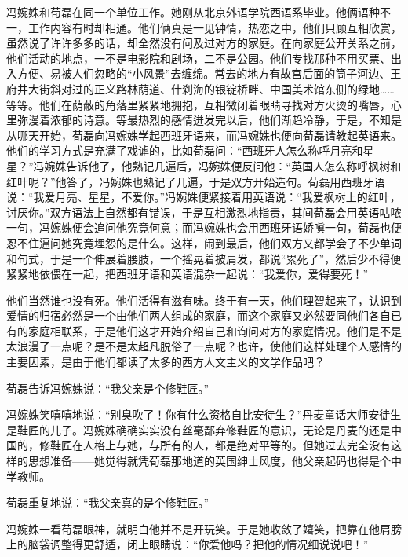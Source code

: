 \par 冯婉姝和荀磊在同一个单位工作。她刚从北京外语学院西语系毕业。他俩语种不一，工作内容有时却相通。他们俩真是一见钟情，热恋之中，他们只顾互相欣赏，虽然说了许许多多的话，却全然没有问及过对方的家庭。在向家庭公开关系之前，他们活动的地点，一不是电影院和剧场，二不是公园。他们专找那种不用买票、出入方便、易被人们忽略的“小风景”去缠绵。常去的地方有故宫后面的筒子河边、王府井大街斜对过的正义路林荫道、什刹海的银锭桥畔、中国美术馆东侧的绿地……等等。他们在荫蔽的角落里紧紧地拥抱，互相微闭着眼睛寻找对方火烫的嘴唇，心里弥漫着浓郁的诗意。等最热烈的感情迸发完以后，他们渐趋冷静，于是，不知是从哪天开始，荀磊向冯婉姝学起西班牙语来，而冯婉姝也便向荀磊请教起英语来。他们的学习方式是充满了戏谑的，比如荀磊问：“西班牙人怎么称呼月亮和星星？”冯婉姝告诉他了，他熟记几遍后，冯婉姝便反问他：“英国人怎么称呼枫树和红叶呢？”他答了，冯婉姝也熟记了几遍，于是双方开始造句。荀磊用西班牙语说：“我爱月亮、星星，不爱你。”冯婉姝便紧接着用英语说：“我爱枫树上的红叶，讨厌你。”双方语法上自然都有错误，于是互相激烈地指责，其间荀磊会用英语咕哝一句，冯婉姝便会追问他究竟何意；而冯婉姝也会用西班牙语娇嗔一句，荀磊也便忍不住逼问她究竟埋怨的是什么。这样，闹到最后，他们双方又都学会了不少单词和句式，于是一个伸展着腰肢，一个摇晃着披肩发，都说“累死了”，然后少不得便紧紧地依偎在一起，把西班牙语和英语混杂一起说：“我爱你，爱得要死！”
\par 他们当然谁也没有死。他们活得有滋有味。终于有一天，他们理智起来了，认识到爱情的归宿必然是一个由他们两人组成的家庭，而这个家庭又必然要同他们各自已有的家庭相联系，于是他们这才开始介绍自己和询问对方的家庭情况。他们是不是太浪漫了一点呢？是不是太超凡脱俗了一点呢？也许，使他们这样处理个人感情的主要因素，是由于他们都读了太多的西方人文主义的文学作品吧？
\par 荀磊告诉冯婉姝说：“我父亲是个修鞋匠。”
\par 冯婉姝笑嘻嘻地说：“别臭吹了！你有什么资格自比安徒生？”丹麦童话大师安徒生是鞋匠的儿子。冯婉姝确确实实没有丝毫鄙弃修鞋匠的意识，无论是丹麦的还是中国的，修鞋匠在人格上与她，与所有的人，都是绝对平等的。但她过去完全没有这样的思想准备——她觉得就凭荀磊那地道的英国绅士风度，他父亲起码也得是个中学教师。
\par 荀磊重复地说：“我父亲真的是个修鞋匠。”
\par 冯婉姝一看荀磊眼神，就明白他并不是开玩笑。于是她收敛了嬉笑，把靠在他肩膀上的脑袋调整得更舒适，闭上眼睛说：“你爱他吗？把他的情况细说说吧！”
